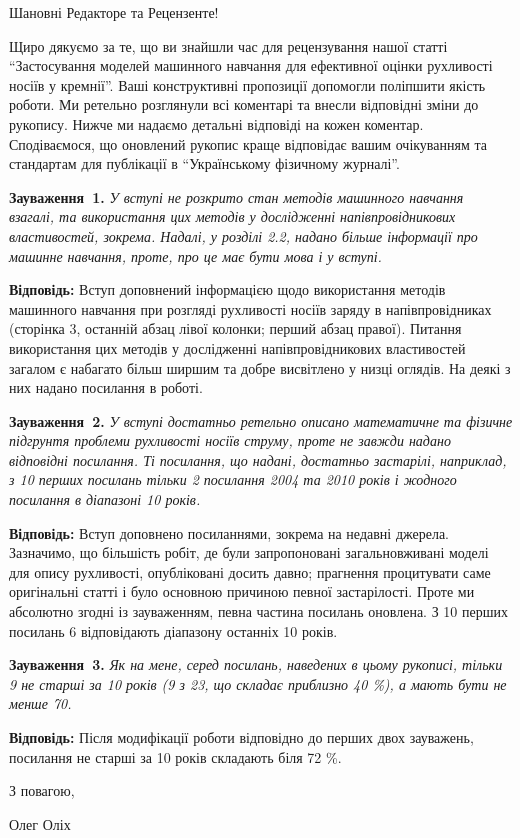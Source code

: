 \documentclass[fleqn,twoside,twocolumn,nofootinbib,showkeys]{revtex4}
\begin{document}
Шановні Редакторе та Рецензенте!

Щиро дякуємо за те, що ви знайшли час для рецензування нашої статті
``Застосування моделей машинного навчання для ефективної оцінки рухливості носіїв у кремнії''.
Ваші конструктивні пропозиції допомогли  поліпшити якість  роботи.
Ми ретельно розглянули всі коментарі та внесли відповідні зміни до рукопису.
Нижче ми надаємо детальні відповіді на кожен коментар.
Сподіваємося, що оновлений рукопис краще відповідає вашим очікуванням та стандартам для публікації в ``Українському фізичному журналі''.



\vspace{1cm}
\noindent
\textcolor[rgb]{0.00,0.50,1.00}{\textbf{Зауваження~1.}}
\emph{У вступі не розкрито стан методів машинного навчання взагалі, та використання цих методів у дослідженні напівпровідникових властивостей, зокрема. Надалі, у розділі 2.2, надано більше інформації про машинне навчання, проте, про це має бути мова і у вступі.}

\noindent
\textcolor[rgb]{0.51,0.00,0.00}{\textbf{Відповідь:}}
Вступ доповнений інформацією щодо використання методів машинного навчання при розгляді рухливості носіїв заряду в напівпровідниках
(сторінка 3, останній абзац лівої колонки; перший абзац правої).
Питання використання цих методів у дослідженні напівпровідникових властивостей загалом є набагато більш ширшим та добре висвітлено у низці оглядів.
На деякі з них надано посилання в роботі.


\vspace{1cm}
\noindent
\textcolor[rgb]{0.00,0.50,1.00}{\textbf{Зауваження~2.}}
\emph{У вступі достатньо ретельно описано математичне та фізичне підгрунтя проблеми рухливості носіїв струму, проте не завжди надано відповідні посилання.
Ті посилання, що надані, достатньо застарілі, наприклад, з 10 перших посилань тільки 2 посилання 2004 та 2010 років і жодного посилання в діапазоні 10 років.}

\noindent
\textcolor[rgb]{0.51,0.00,0.00}{\textbf{Відповідь:}}
Вступ доповнено посиланнями, зокрема на недавні джерела.
Зазначимо, що більшість робіт, де були запропоновані загальновживані моделі для опису рухливості,
опубліковані досить давно; 
прагнення процитувати саме оригінальні статті і було основною причиною певної застарілості.
Проте ми абсолютно згодні із зауваженням, певна частина посилань оновлена.
З 10 перших посилань 6 відповідають діапазону останніх 10 років.


\vspace{1cm}
\noindent
\textcolor[rgb]{0.00,0.50,1.00}{\textbf{Зауваження~3.}}
\emph{Як на мене, серед посилань, наведених в цьому рукописі, тільки 9 не старші за 10 років (9 з 23, що складає приблизно 40 \%), а мають бути не менше 70.}

\noindent
\textcolor[rgb]{0.51,0.00,0.00}{\textbf{Відповідь:}}
Після модифікації роботи відповідно до перших двох зауважень, посилання не старші за 10 років складають біля 72 \%.


\vspace{1cm}
З повагою, 

Олег Оліх
\end{document}
